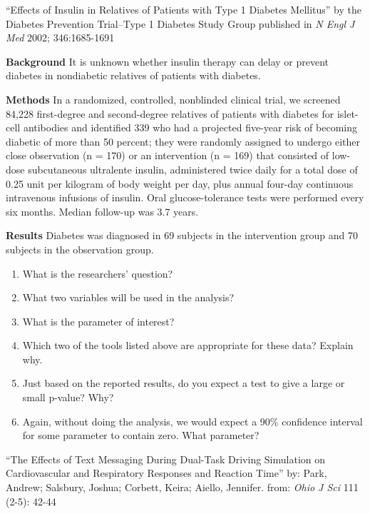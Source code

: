 \begin{list}{}{}
\item [``Effects of Insulin in Relatives of Patients with Type 1
  Diabetes Mellitus''] by the Diabetes Prevention Trial–Type 1 Diabetes
  Study Group published in {\it N Engl J Med} 2002; 346:1685-1691

  \begin{list}{}{}
  \item [\bf Background]
    It is unknown whether insulin therapy can delay or prevent
    diabetes in nondiabetic relatives of patients with diabetes. 
  \item [\bf Methods]
    In a randomized, controlled, nonblinded clinical trial, we
    screened 84,228 first-degree and second-degree relatives of
    patients with diabetes for islet-cell antibodies and identified
    339 who had a projected five-year risk of becoming diabetic of
    more than 50 percent; they were randomly assigned to undergo
    either close observation (n = 170) or an intervention (n = 169)
    that consisted of low-dose subcutaneous ultralente insulin,
    administered twice daily for a total dose of 0.25 unit per
    kilogram of body weight per day, plus annual four-day continuous
    intravenous infusions of insulin. Oral glucose-tolerance tests
    were performed every six months. Median follow-up was 3.7 years.
  \item [\bf Results]
    Diabetes was diagnosed in 69 subjects in the intervention group
    and 70 subjects in the observation group. 
  \end{list}
  \begin{enumerate}
   \item What is the researchers' question?\vspace{1cm}
   \item What two variables will be used in the analysis?\vspace{1cm}
   \item What is the parameter of interest?\vspace{1cm}
   \item Which two of the tools listed above are appropriate for these
     data? Explain why.\vspace{2cm}
   \item Just based on the reported results, do you expect a test to
     give a large or small p-value?  Why?\vspace{1cm}
   \item Again, without doing the analysis, we would expect a 90\%
     confidence interval for some parameter to contain zero.  What
     parameter? \vspace{1cm}
  \end{enumerate}
\item [``The Effects of Text Messaging During Dual-Task Driving Simulation on Cardiovascular and Respiratory Responses and Reaction Time'']
  by:  	Park, Andrew; Salsbury, Joshua; Corbett, Keira; Aiello,
  Jennifer. 
  from: {\it Ohio J Sci} 111 (2-5): 42-44 


\end{list}
